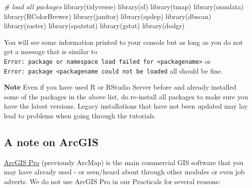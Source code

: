 \documentclass[
]{book}
\newenvironment{Shaded}{\begin{snugshade}}{\end{snugshade}}
\newcommand{\CommentTok}[1]{\textcolor[rgb]{0.56,0.35,0.01}{\textit{#1}}}
\newcommand{\FunctionTok}[1]{\textcolor[rgb]{0.00,0.00,0.00}{#1}}
\newcommand{\NormalTok}[1]{#1}
\begin{document}
\begin{Shaded}
\begin{Highlighting}[]
\CommentTok{\# load all packages}
\FunctionTok{library}\NormalTok{(tidyverse)}
\FunctionTok{library}\NormalTok{(sf)}
\FunctionTok{library}\NormalTok{(tmap)}
\FunctionTok{library}\NormalTok{(osmdata)}
\FunctionTok{library}\NormalTok{(RColorBrewer)}
\FunctionTok{library}\NormalTok{(janitor)}
\FunctionTok{library}\NormalTok{(spdep)}
\FunctionTok{library}\NormalTok{(dbscan)}
\FunctionTok{library}\NormalTok{(raster)}
\FunctionTok{library}\NormalTok{(spatstat)}
\FunctionTok{library}\NormalTok{(gstat)}
\FunctionTok{library}\NormalTok{(dodgr)}
\end{Highlighting}
\end{Shaded}

You will see some information printed to your console but as long as you do not get a message that is similar to \texttt{Error:\ package\ or\ namespace\ load\ failed\ for\ \textless{}packagename\textgreater{}} or \texttt{Error:\ package\ \textquotesingle{}\textless{}packagename\textquotesingle{}\ could\ not\ be\ loaded} all should be fine.

\textbf{Note}
Even if you have used R or RStudio Server before and already installed some of the packages in the above list, do re-install all packages to make sure you have the latest versions. Legacy installations that have not been updated may lay lead to problems when going through the tutorials.

\hypertarget{a-note-on-arcgis}{%
\subsection{A note on ArcGIS}\label{a-note-on-arcgis}}

\href{https://www.esri.com/en-us/arcgis/products/arcgis-pro/overview}{ArcGIS Pro} (previously ArcMap) is the main commercial GIS software that you may have already used - or seen/heard about through other modules or even job adverts. We do not use ArcGIS Pro in our Practicals for several reasons:
\end{document}
